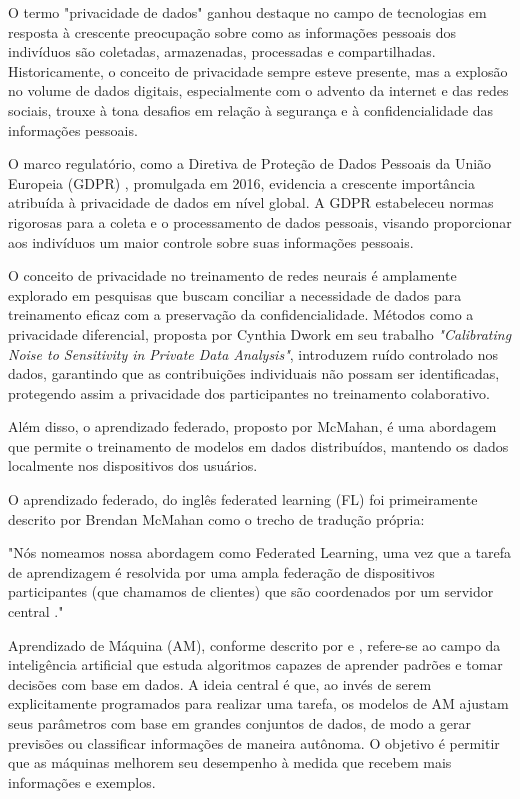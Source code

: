 O termo "privacidade de dados" ganhou destaque no campo de tecnologias em resposta à crescente preocupação sobre como as informações pessoais dos indivíduos são coletadas, armazenadas, processadas e compartilhadas. Historicamente, o conceito de privacidade sempre esteve presente, mas a explosão no volume de dados digitais, especialmente com o advento da internet e das redes sociais, trouxe à tona desafios em relação à segurança e à confidencialidade das informações pessoais.

O marco regulatório, como a Diretiva de Proteção de Dados Pessoais da União Europeia (GDPR) \cite{GDPR}, promulgada em 2016, evidencia a crescente importância atribuída à privacidade de dados em nível global. A GDPR estabeleceu normas rigorosas para a coleta e o processamento de dados pessoais, visando proporcionar aos indivíduos um maior controle sobre suas informações pessoais.

O conceito de privacidade no treinamento de redes neurais é amplamente explorado em pesquisas que buscam conciliar a necessidade de dados para treinamento eficaz com a preservação da confidencialidade. Métodos como a privacidade diferencial, proposta por Cynthia Dwork em seu trabalho \textit{"Calibrating Noise to Sensitivity in Private Data Analysis"}\cite{dwork2006calibrating}, introduzem ruído controlado nos dados, garantindo que as contribuições individuais não possam ser identificadas, protegendo assim a privacidade dos participantes no treinamento colaborativo.

Além disso, o aprendizado federado, proposto por McMahan\cite{mcmahan2017communication}, é uma abordagem que permite o treinamento de modelos em dados distribuídos, mantendo os dados localmente nos dispositivos dos usuários.

O aprendizado federado, do inglês federated learning (FL) foi primeiramente descrito por Brendan McMahan como o trecho de tradução própria:

\begin{citacao}
"Nós nomeamos nossa abordagem como Federated Learning, uma vez que a tarefa de aprendizagem é resolvida por uma ampla federação de dispositivos participantes (que chamamos de clientes) que são coordenados por um servidor central \cite{mcmahan2017communication}."
\end{citacao}

Aprendizado de Máquina (AM), conforme descrito por \cite{russell2022} e \cite{goodfellow2016}, refere-se ao campo da inteligência artificial que estuda algoritmos capazes de aprender padrões e tomar decisões com base em dados. A ideia central é que, ao invés de serem explicitamente programados para realizar uma tarefa, os modelos de AM ajustam seus parâmetros com base em grandes conjuntos de dados, de modo a gerar previsões ou classificar informações de maneira autônoma. O objetivo é permitir que as máquinas melhorem seu desempenho à medida que recebem mais informações e exemplos.

